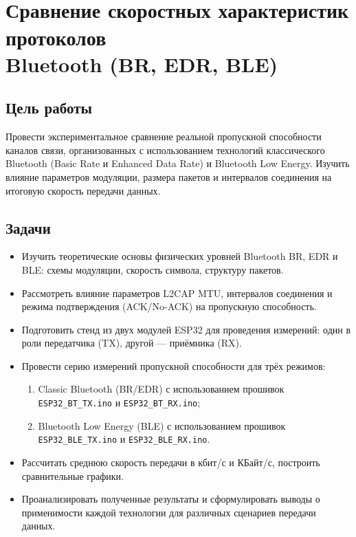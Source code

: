 \section[Сравнение скоростных характеристик протоколов Bluetooth (BR, EDR, BLE)]
{\\Сравнение скоростных характеристик протоколов \\ Bluetooth (BR, EDR, BLE)}

\subsection{Цель работы}
Провести экспериментальное сравнение реальной пропускной способности каналов связи, организованных с использованием технологий классического Bluetooth (Basic Rate и Enhanced Data Rate) и Bluetooth Low Energy. Изучить влияние параметров модуляции, размера пакетов и интервалов соединения на итоговую скорость передачи данных.

\subsection{Задачи}
\begin{itemize}[nosep]
    \item Изучить теоретические основы физических уровней Bluetooth BR, EDR и BLE: схемы модуляции, скорость символа, структуру пакетов.
    \item Рассмотреть влияние параметров L2CAP MTU, интервалов соединения и режима подтверждения (ACK/No-ACK) на пропускную способность.
    \item Подготовить стенд из двух модулей ESP32 для проведения измерений: один в роли передатчика (TX), другой — приёмника (RX).
    \item Провести серию измерений пропускной способности для трёх режимов:
    \begin{enumerate}[label=\alph*), nosep]
        \item Classic Bluetooth (BR/EDR) с использованием прошивок \texttt{ESP32\_BT\_TX.ino} и \texttt{ESP32\_BT\_RX.ino};
        \item Bluetooth Low Energy (BLE) с использованием прошивок \texttt{ESP32\_BLE\_TX.ino} и \texttt{ESP32\_BLE\_RX.ino}.
    \end{enumerate}
    \item Рассчитать среднюю скорость передачи в кбит/с и КБайт/с, построить сравнительные графики.
    \item Проанализировать полученные результаты и сформулировать выводы о применимости каждой технологии для различных сценариев передачи данных.
\end{itemize}

